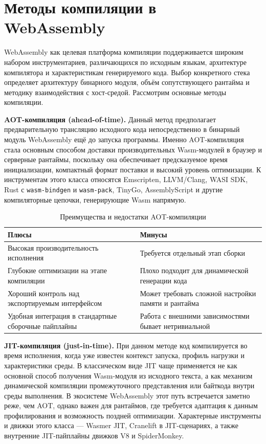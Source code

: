 \section{Методы компиляции в WebAssembly}

    \quad WebAssembly как целевая платформа компиляции поддерживается широким набором инструментариев, различающихся по исходным языкам, архитектуре компилятора и характеристикам генерируемого кода. Выбор конкретного стека определяет архитектуру бинарного модуля, объём сопутствующего рантайма и методику взаимодействия с хост-средой. Рассмотрим основные методы компиляции.

    \quad \textbf{AOT-компиляция (ahead-of-time).} Данный метод предполагает предварительную трансляцию исходного кода непосредственно в бинарный модуль WebAssembly ещё до запуска программы. Именно AOT-компиляция стала основным способом доставки производительных Wasm-модулей в браузер и серверные рантаймы, поскольку она обеспечивает предсказуемое время инициализации, компактный формат поставки и высокий уровень оптимизации. К инструментам этого класса относятся Emscripten, LLVM/Clang, WASI SDK, Rust с \texttt{wasm-bindgen} и \texttt{wasm-pack}, TinyGo, AssemblyScript и другие компиляторные цепочки, генерирующие Wasm напрямую.

\begin{table}[htbp]
\centering
\scriptsize
\renewcommand{\arraystretch}{1.15}
\begin{tabular}{|p{5.8cm}|p{5.8cm}|}
\hline
\textbf{Плюсы} & \textbf{Минусы} \\
\hline
Высокая производительность исполнения & Требуется отдельный этап сборки \\
\hline
Глубокие оптимизации на этапе компиляции & Плохо подходит для динамической генерации кода \\
\hline
Хороший контроль над экспортируемым интерфейсом & Может требовать сложной настройки памяти и рантайма \\
\hline
Удобная интеграция в стандартные сборочные пайплайны & Работа с внешними зависимостями бывает нетривиальной \\
\hline
\end{tabular}
\caption{Преимущества и недостатки AOT-компиляции}
\label{tab:aot_pros_cons}
\end{table}

    \quad \textbf{JIT-компиляция (just-in-time).} При данном методе код компилируется во время исполнения, когда уже известен контекст запуска, профиль нагрузки и характеристики среды. В классическом виде JIT чаще применяется не как основной способ получения Wasm-модуля из исходного текста, а как механизм динамической компиляции промежуточного представления или байткода внутри среды выполнения. В экосистеме WebAssembly этот путь встречается заметно реже, чем AOT, однако важен для рантаймов, где требуется адаптация к данным профилирования и возможность поздней оптимизации. Характерные инструменты и движки этого класса --- Wasmer JIT, Cranelift в JIT-сценариях, а также внутренние JIT-пайплайны движков V8 и SpiderMonkey.

